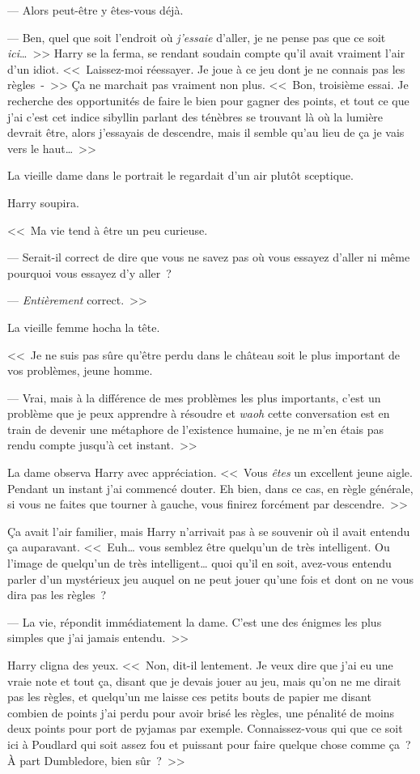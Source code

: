 --- Alors peut-être y êtes-vous déjà.

--- Ben, quel que soit l'endroit où \emph{j'essaie} d'aller, je ne pense pas que ce soit \emph{ici}…~>> Harry se la ferma, se rendant soudain compte qu'il avait vraiment l'air d'un idiot. <<~Laissez-moi réessayer. Je joue à ce jeu dont je ne connais pas les règles~-~>> Ça ne marchait pas vraiment non plus. <<~Bon, troisième essai. Je recherche des opportunités de faire le bien pour gagner des points, et tout ce que j'ai c'est cet indice sibyllin parlant des ténèbres se trouvant là où la lumière devrait être, alors j'essayais de descendre, mais il semble qu'au lieu de ça je vais vers le haut…~>>

La vieille dame dans le portrait le regardait d'un air plutôt sceptique.

Harry soupira.

<<~Ma vie tend à être un peu curieuse.

--- Serait-il correct de dire que vous ne savez pas où vous essayez d'aller ni même pourquoi vous essayez d'y aller~?

--- \emph{Entièrement} correct.~>>

La vieille femme hocha la tête.

<<~Je ne suis pas sûre qu'être perdu dans le château soit le plus important de vos problèmes, jeune homme.

--- Vrai, mais à la différence de mes problèmes les plus importants, c'est un problème que je peux apprendre à résoudre et \emph{waoh} cette conversation est en train de devenir une métaphore de l'existence humaine, je ne m'en étais pas rendu compte jusqu'à cet instant.~>>

La dame observa Harry avec appréciation. <<~Vous \emph{êtes} un excellent jeune aigle. Pendant un instant j'ai commencé douter. Eh bien, dans ce cas, en règle générale, si vous ne faites que tourner à gauche, vous finirez forcément par descendre.~>>

Ça avait l'air familier, mais Harry n'arrivait pas à se souvenir où il avait entendu ça auparavant. <<~Euh… vous semblez être quelqu'un de très intelligent. Ou l'image de quelqu'un de très intelligent… quoi qu'il en soit, avez-vous entendu parler d'un mystérieux jeu auquel on ne peut jouer qu'une fois et dont on ne vous dira pas les règles~?

--- La vie, répondit immédiatement la dame. C'est une des énigmes les plus simples que j'ai jamais entendu.~>>

Harry cligna des yeux. <<~Non, dit-il lentement. Je veux dire que j'ai eu une vraie note et tout ça, disant que je devais jouer au jeu, mais qu'on ne me dirait pas les règles, et quelqu'un me laisse ces petits bouts de papier me disant combien de points j'ai perdu pour avoir brisé les règles, une pénalité de moins deux points pour port de pyjamas par exemple. Connaissez-vous qui que ce soit ici à Poudlard qui soit assez fou et puissant pour faire quelque chose comme ça~? À part Dumbledore, bien sûr~?~>>

